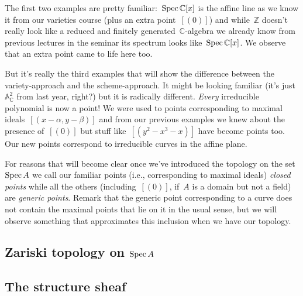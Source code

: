 The first two examples are pretty familiar:~$\operatorname{Spec}\mathbb{C}[x]$ is the affine line as we know it from our varieties course (plus an extra point~$[(0)]$) and while~$\mathbb{Z}$ doesn't really look like a reduced and finitely generated~$\mathbb{C}$-algebra we already know from previous lectures in the seminar its spectrum looks like~$\operatorname{Spec}\mathbb{C}[x]$. We observe that an extra point came to life here too.

But it's really the third examples that will show the difference between the variety-approach and the scheme-approach. It might be looking familiar (it's just~$\mathbb{A}^2_{\mathbb{C}}$ from last year, right?) but it is radically different. \emph{Every} irreducible polynomial is now a point! We were used to points corresponding to maximal ideals~$[(x-\alpha,y-\beta)]$ and from our previous examples we knew about the presence of~$[(0)]$ but stuff like~$[(y^2-x^3-x)]$ have become points too. Our new points correspond to irreducible curves in the affine plane.

For reasons that will become clear once we've introduced the topology on the set~$\operatorname{Spec} A$ we call our familiar points (i.e., corresponding to maximal ideals) \emph{closed points} while all the others (including~$[(0)]$, if~$A$ is a domain but not a field) are \emph{generic points}. Remark that the generic point corresponding to a curve does not contain the maximal points that lie on it in the usual sense, but we will observe something that approximates this inclusion when we have our topology.

\subsection{Zariski topology on $\operatorname{Spec} A$}

\subsection{The structure sheaf}

